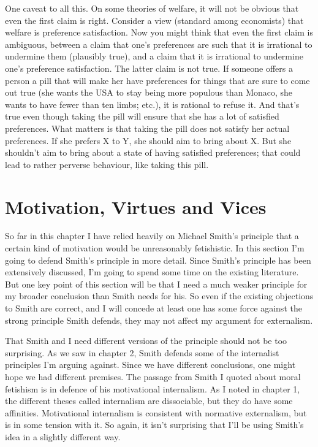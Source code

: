 \documentclass[
  10pt,
  letterpaper,
  twoside]{scrbook}
\begin{document}
One caveat to all this. On some theories of welfare, it will not be
obvious that even the first claim is right. Consider a view (standard
among economists) that welfare is preference satisfaction. Now you might
think that even the first claim is ambiguous, between a claim that one's
preferences are such that it is irrational to undermine them (plausibly
true), and a claim that it is irrational to undermine one's preference
satisfaction. The latter claim is not true. If someone offers a person a
pill that will make her have preferences for things that are sure to
come out true (she wants the USA to stay being more populous than
Monaco, she wants to have fewer than ten limbs; etc.), it is rational to
refuse it. And that's true even though taking the pill will ensure that
she has a lot of satisfied preferences. What matters is that taking the
pill does not satisfy her actual preferences. If she prefers X to Y, she
should aim to bring about X. But she shouldn't aim to bring about a
state of having satisfied preferences; that could lead to rather
perverse behaviour, like taking this pill.

\section{Motivation, Virtues and Vices}\label{motivationvirtuesandvices}

So far in this chapter I have relied heavily on Michael Smith's
principle that a certain kind of motivation would be unreasonably
fetishistic. In this section I'm going to defend Smith's principle in
more detail. Since Smith's principle has been extensively discussed, I'm
going to spend some time on the existing literature. But one key point
of this section will be that I need a much weaker principle for my
broader conclusion than Smith needs for his. So even if the existing
objections to Smith are correct, and I will concede at least one has
some force against the strong principle Smith defends, they may not
affect my argument for externalism.

That Smith and I need different versions of the principle should not be
too surprising. As we saw in chapter 2, Smith defends some of the
internalist principles I'm arguing against. Since we have different
conclusions, one might hope we had different premises. The passage from
Smith I quoted about moral fetishism is in defence of his motivational
internalism. As I noted in chapter 1, the different theses called
internalism are dissociable, but they do have some affinities.
Motivational internalism is consistent with normative externalism, but
is in some tension with it. So again, it isn't surprising that I'll be
using Smith's idea in a slightly different way.
\end{document}
